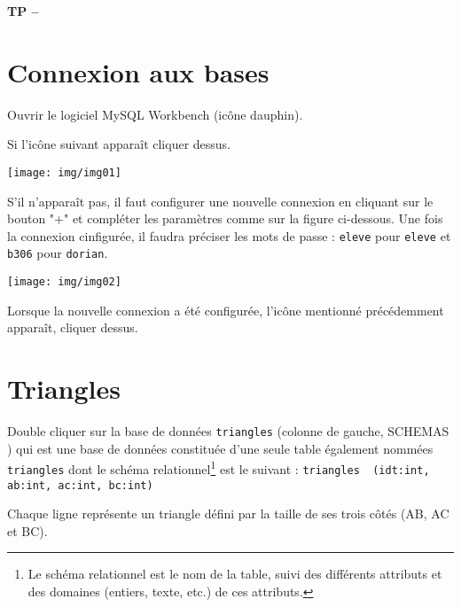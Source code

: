 

%



\begin{center}
{\Large\bf TP \no {\numero} -- \descrip}
\end{center}

\section{Connexion aux bases}

Ouvrir le logiciel MySQL Workbench (icône dauphin).

Si l'icône suivant apparaît cliquer dessus.

\begin{center}
\texttt{[image: img/img01]}
\end{center}

S'il n'apparaît pas, il faut configurer une nouvelle connexion en cliquant sur le bouton "+" et compléter les paramètres comme sur la figure ci-dessous. Une fois la connexion cinfigurée, il faudra préciser les mots de passe : \texttt{eleve} pour \texttt{eleve} et \texttt{b306} pour \texttt{dorian}.

\begin{center}
\texttt{[image: img/img02]}
\end{center}

Lorsque la nouvelle connexion a été configurée, l'icône mentionné précédemment apparaît, cliquer dessus.

\section{Triangles}

Double cliquer sur la base de données \verb|triangles| (colonne de gauche, \og SCHEMAS \fg) qui est une base de données constituée d'une seule table également nommées \verb|triangles| dont le schéma relationnel\footnote{Le schéma relationnel est le nom de la table, suivi des différents attributs et des domaines (entiers, texte, etc.) de ces attributs.} est le suivant : \verb|triangles  (idt:int, ab:int, ac:int, bc:int)|

Chaque ligne représente un triangle défini par la taille de ses trois côtés (AB, AC et BC).

